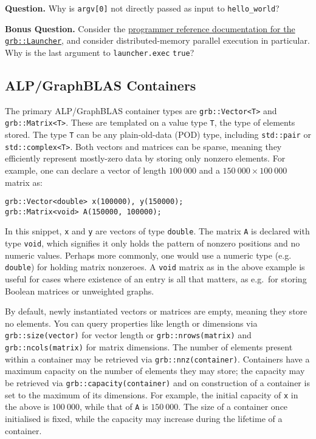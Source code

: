 \noindent \textbf{Question.} Why is \texttt{argv[0]} not directly passed as input to \texttt{hello\_world}?

\noindent \textbf{Bonus Question.} Consider the \href{http://albert-jan.yzelman.net/alp/user/classgrb_1_1Launcher.html#af33a2d0ff876594143988613ebaebae7}{programmer reference documentation for the \texttt{grb::Launcher}}, and consider distributed-memory parallel execution in particular. Why is the last argument to \texttt{launcher.exec} \texttt{true}?


\subsection{ALP/GraphBLAS Containers}

The primary ALP/GraphBLAS container types are \texttt{grb::Vector<T>} and \texttt{grb::Matrix<T>}. These are templated on a value type \texttt{T}, the type of elements stored. The type \texttt{T} can be any plain-old-data (POD) type, including \texttt{std::pair} or \texttt{std::complex<T>}. Both vectors and matrices can be sparse, meaning they efficiently represent mostly-zero data by storing only nonzero elements. For example, one can declare a vector of length $100\ 000$ and a $150\ 000\times100\ 000$ matrix as:
\begin{lstlisting}
grb::Vector<double> x(100000), y(150000);
grb::Matrix<void> A(150000, 100000);
\end{lstlisting}
In this snippet, \texttt{x} and \texttt{y} are vectors of type \texttt{double}. The matrix \texttt{A} is declared with type \texttt{void}, which signifies it only holds the pattern of nonzero positions and no numeric values. Perhaps more commonly, one would use a numeric type (e.g. \texttt{double}) for holding matrix nonzeroes. A \texttt{void} matrix as in the above example is useful for cases where existence of an entry is all that matters, as e.g.\ for storing Boolean matrices or unweighted graphs.

By default, newly instantiated vectors or matrices are empty, meaning they store no elements. You can query properties like length or dimensions via \texttt{grb::size(vector)} for vector length or \texttt{grb::nrows(matrix)} and \texttt{grb::ncols(matrix)} for matrix dimensions. The number of elements present within a container may be retrieved via \texttt{grb::nnz(container)}. Containers have a maximum capacity on the number of elements they may store; the capacity may be retrieved via \texttt{grb::capacity(container)} and on construction of a container is set to the maximum of its dimensions. For example, the initial capacity of \texttt{x} in the above is $100\ 000$, while that of \texttt{A} is $150\ 000$. The size of a container once initialised is fixed, while the capacity may increase during the lifetime of a container.

